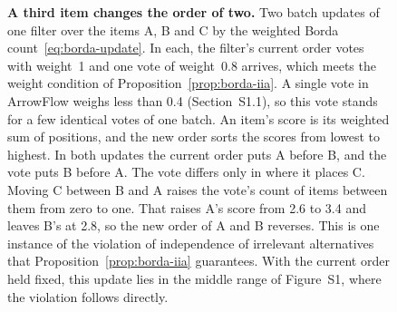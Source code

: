 \begin{figure}[!htbp]
\caption{\textbf{A third item changes the order of two.} Two batch updates of one filter over the items A, B and C by the weighted Borda count~\eqref{eq:borda-update}. In each, the filter's current order votes with weight~1 and one vote of weight~0.8 arrives, which meets the weight condition of Proposition~\ref{prop:borda-iia}. A single vote in ArrowFlow weighs less than 0.4 (Section~S1.1), so this vote stands for a few identical votes of one batch. An item's score is its weighted sum of positions, and the new order sorts the scores from lowest to highest. In both updates the current order puts A before B, and the vote puts B before A. The vote differs only in where it places C. Moving C between B and A raises the vote's count of items between them from zero to one. That raises A's score from 2.6 to 3.4 and leaves B's at 2.8, so the new order of A and B reverses. This is one instance of the violation of independence of irrelevant alternatives that Proposition~\ref{prop:borda-iia} guarantees. With the current order held fixed, this update lies in the middle range of Figure~S1, where the violation follows directly.}
\label{fig:iia}
\end{figure}
